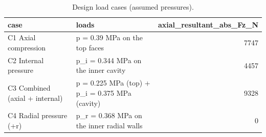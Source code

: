 \begin{table}[htbp]
\centering
\caption{Design load cases (assumed pressures).}
\label{tab:T10_02_load_cases}
\begin{tabular}{llr}
\toprule
case & loads & axial\_resultant\_abs\_Fz\_N \\
\midrule
C1 Axial compression & p = 0.39 MPa on the top faces & 7747 \\
C2 Internal pressure & p\_i = 0.344 MPa on the inner cavity & 4457 \\
C3 Combined (axial + internal) & p = 0.225 MPa (top) + p\_i = 0.375 MPa (cavity) & 9328 \\
C4 Radial pressure (+r) & p\_r = 0.368 MPa on the inner radial walls & 0 \\
\bottomrule
\end{tabular}
\end{table}

